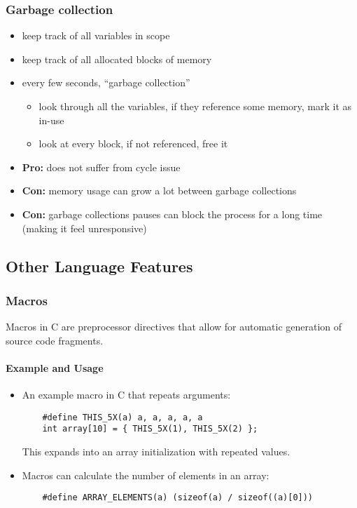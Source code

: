\documentclass[12pt]{article}
\begin{document}





\subsubsection{Garbage collection}

\begin{itemize}
  \item keep track of all variables in scope
  \item keep track of all allocated blocks of memory
  \item every few seconds, ``garbage collection''
    \begin{itemize}
      \item look through all the variables, if they reference some memory, mark it as in-use
      \item look at every block, if not referenced, free it
    \end{itemize}
\end{itemize}

\begin{itemize}
  \item \textbf{Pro:} does not suffer from cycle issue
  \item \textbf{Con:} memory usage can grow a lot between garbage collections
  \item \textbf{Con:} garbage collections pauses can block the process for a long time (making it feel unresponsive)
\end{itemize}

\subsection{Other Language Features}


\subsubsection{Macros}
Macros in C are preprocessor directives that allow for automatic generation of source code fragments.

\paragraph{Example and Usage}
\begin{itemize}
    \item An example macro in C that repeats arguments:
    \begin{lstlisting}
    #define THIS_5X(a) a, a, a, a, a
    int array[10] = { THIS_5X(1), THIS_5X(2) };
    \end{lstlisting}
    This expands into an array initialization with repeated values.

    \item Macros can calculate the number of elements in an array:
    \begin{lstlisting}
    #define ARRAY_ELEMENTS(a) (sizeof(a) / sizeof((a)[0]))
    \end{lstlisting}
\end{itemize}
\end{document}
